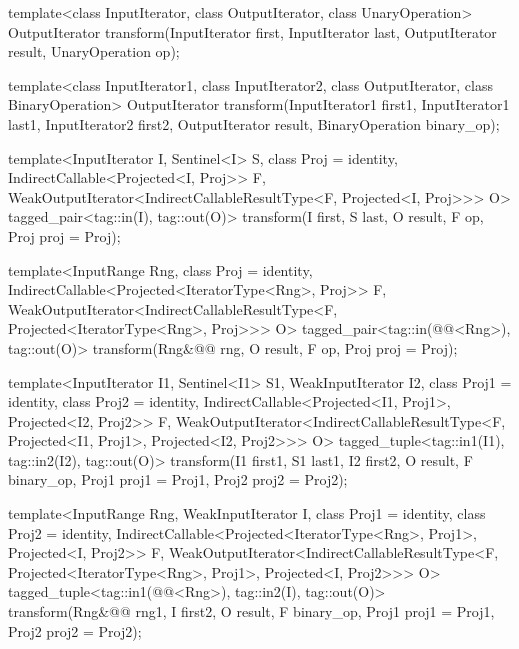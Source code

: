 %
\begin{removedblock}
\begin{itemdecl}
template<class InputIterator, class OutputIterator,
         class UnaryOperation>
  OutputIterator
    transform(InputIterator first, InputIterator last,
              OutputIterator result, UnaryOperation op);

template<class InputIterator1, class InputIterator2,
         class OutputIterator, class BinaryOperation>
  OutputIterator
    transform(InputIterator1 first1, InputIterator1 last1,
              InputIterator2 first2, OutputIterator result,
              BinaryOperation binary_op);
\end{itemdecl}
\end{removedblock}
\begin{addedblock}
\begin{itemdecl}
template<InputIterator I, Sentinel<I> S, class Proj = identity,
    IndirectCallable<Projected<I, Proj>> F,
    WeakOutputIterator<IndirectCallableResultType<F, Projected<I, Proj>>> O>
  tagged_pair<tag::in(I), tag::out(O)>
    transform(I first, S last, O result, F op, Proj proj = Proj{});

template<InputRange Rng, class Proj = identity,
    IndirectCallable<Projected<IteratorType<Rng>, Proj>> F,
    WeakOutputIterator<IndirectCallableResultType<F,
      Projected<IteratorType<Rng>, Proj>>> O>
  tagged_pair<tag::in(@@<Rng>), tag::out(O)>
    transform(Rng&@\newtxt{\&}@ rng, O result, F op, Proj proj = Proj{});

template<InputIterator I1, Sentinel<I1> S1, WeakInputIterator I2,
    class Proj1 = identity, class Proj2 = identity,
    IndirectCallable<Projected<I1, Proj1>, Projected<I2, Proj2>> F,
    WeakOutputIterator<IndirectCallableResultType<F, Projected<I1, Proj1>,
      Projected<I2, Proj2>>> O>
  tagged_tuple<tag::in1(I1), tag::in2(I2), tag::out(O)>
    transform(I1 first1, S1 last1, I2 first2, O result,
              F binary_op, Proj1 proj1 = Proj1{}, Proj2 proj2 = Proj2{});

template<InputRange Rng, WeakInputIterator I,
    class Proj1 = identity, class Proj2 = identity,
    IndirectCallable<Projected<IteratorType<Rng>, Proj1>, Projected<I, Proj2>> F,
    WeakOutputIterator<IndirectCallableResultType<F,
      Projected<IteratorType<Rng>, Proj1>, Projected<I, Proj2>>> O>
  tagged_tuple<tag::in1(@@<Rng>), tag::in2(I), tag::out(O)>
    transform(Rng&@\newtxt{\&}@ rng1, I first2, O result,
              F binary_op, Proj1 proj1 = Proj1{}, Proj2 proj2 = Proj2{});


\end{itemdecl}
\end{addedblock}
